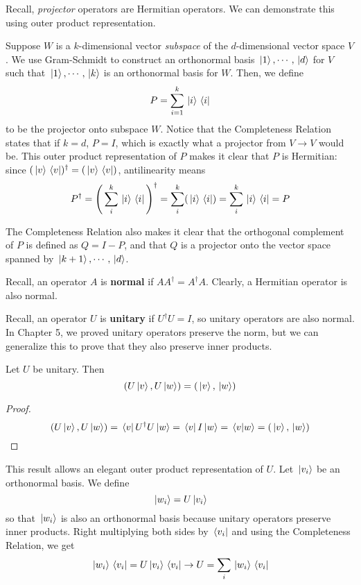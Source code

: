 Recall, \textit{projector} operators are Hermitian operators. We can demonstrate this using outer product representation. 

Suppose $W$  is a $k$-dimensional vector \textit{subspace} of the $d$-dimensional vector space $V$. We use Gram-Schmidt to construct an orthonormal basis $\ket*{1}, \cdots, \ket*{d}$ for $V$ such that $\ket*{1}, \cdots, \ket*{k}$ is an orthonormal basis for $W$. Then, we define 
$$P = \sum_{i=1}^{k} \ket*{i} \bra*{i}$$
to be the projector onto subspace $W$. Notice that the Completeness Relation states that if $k = d$, $P = I$, which is exactly what a projector from $V \rightarrow V$ would be. This outer product representation of $P$ makes it clear that $P$ is Hermitian: since $(\ket*{v} \bra*{v})^{\dagger} = (\ket*{v} \bra*{v})$, antilinearity means
$$P^{\dagger} = \Bigg( \sum_{i}^{k} \ket*{i} \bra*{i} \Bigg)^{\dagger} = \sum_{i}^{k} (\ket*{i} \bra*{i}) = \sum_{i}^{k} \ket*{i} \bra*{i} = P$$

The Completeness Relation also makes it clear that the orthogonal complement of $P$ is defined as $Q = I - P$, and that $Q$ is a projector onto the vector space spanned by $\ket*{k + 1}, \cdots, \ket*{d}$. 

Recall, an operator $A$ is \textbf{normal} if $AA^{\dagger} = A^{\dagger}A$. Clearly, a Hermitian operator is also normal. 

Recall, an operator $U$ is \textbf{unitary} if $U^{\dagger}U = I$, so unitary operators are also normal. In Chapter 5, we proved unitary operators preserve the norm, but we can generalize this to prove that they also preserve inner products. 

\begin{theorem}
Let $U$ be unitary. Then 
$$(U \ket*{v}, U \ket*{w}) = (\ket*{v}, \ket*{w})$$
\end{theorem}

\begin{proof}
$$ (U \ket*{v}, U \ket*{w}) = \bra*{v} U^{\dagger} U \ket*{w} = \bra*{v} I \ket*{w} = \bra*{v}\ket*{w} = (\ket*{v}, \ket*{w})$$
\end{proof}

This result allows an elegant outer product representation of $U$. Let $\ket*{v_{i}}$ be an orthonormal basis. We define $$\ket*{w_{i}} = U \ket*{v_{i}}$$ so that $\ket*{w_{i}}$ is also an orthonormal basis because unitary operators preserve inner products. Right multiplying both sides by $\bra*{v_{i}}$ and using the Completeness Relation, we get 
$$\ket*{w_{i}} \bra*{v_{i}} = U \ket*{v_{i}} \bra*{v_{i}} \rightarrow U = \sum_{i} \ket*{w_{i}} \bra*{v_{i}}$$

